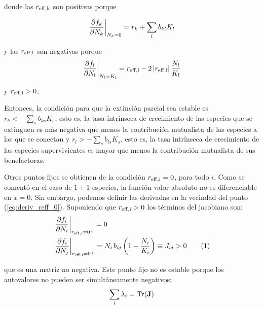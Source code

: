 \noindent donde las $r_{\rm{eff},k}$ son positivas porque

\begin{equation}
\displaystyle
\left.\frac{\partial f_k}{\partial N_k} \right|_{N_k=0} = r_k + \sum_{l}b_{kl}K_l\\
\label{eq:partial_N_0}
\end{equation}

\noindent y las $r_{\rm{eff},l}$ son negativas porque
\begin{equation}
\displaystyle
\left.\frac{\partial f_l}{\partial N_l} \right|_{N_l=K_l} = r_{\rm{eff},l} - 2 \left| r_{\rm{eff},l} \right| \frac{N_l}{K_l} \\
\label{eq:partial_N_K}
\end{equation}

\noindent y $r_{\rm{eff},l}>0$.

Entonces, la condición para que la extinción parcial sea estable es $r_k<-\sum_{s}b_{ks}K_s$, esto es, la tasa intrínseca de crecimiento de las especies que se extinguen es más negativa que menos la contribución mutualista de las especies a las que se conectan y $r_l>-\sum_{s}b_{ls}K_s$, esto es, la tasa intrínseca de crecimiento de las especies supervivientes es mayor que menos la contribución mutualista de sus benefactoras.

Otros puntos fijos se obtienen de la condición $r_{\rm{eff},i}=0$, para todo $i$. Como se comentó en el caso de $1+1$ especies, la función valor absoluto no es diferenciable en $x=0$. Sin embargo, podemos definir las derivadas en la vecindad del punto (\ref{eq:deriv_reff_0}). Suponiendo que $r_{\rm{eff},i}>0$ los términos del jacobiano son:
\begin{align*}
\displaystyle
&\left.\frac{\partial f_i}{\partial N_i} \right|_{r_{\rm{eff},i}=0^{+}} =0\\
&\left.\frac{\partial f_i}{\partial N_j} \right|_{r_{\rm{eff},i}=0^{+}} =N_i\,b_{ij} \left( 1- \frac{N_i}{K_i} \right) \equiv J_{ij}>0
\stepcounter{equation}\tag{\theequation}
\label{eq:rmefi0}
\end{align*}

\noindent que es una matriz no negativa. Este punto fijo no es estable porque los autovalores no pueden ser simultáneamente negativos:
\begin{equation}
\displaystyle
  \sum_i \lambda_i = \rm{Tr} (\mathbf{J})
\end{equation}

